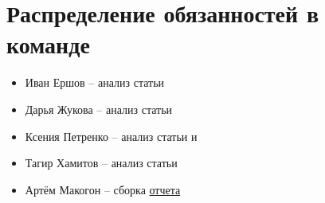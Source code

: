 
\section{Распределение обязанностей в команде}

\begin{itemize}
    \item Иван Ершов -- анализ статьи \cite{pipedream}
    \item Дарья Жукова -- анализ статьи \cite{beginning}
    \item Ксения Петренко -- анализ статьи \cite{shoeybi2019megatron} и \cite{vaswani2017attention}
    \item Тагир Хамитов -- анализ статьи \cite{DBLP}
    \item Артём Макогон -- сборка \href{https://github.com/makogon2907/HSE-Practice-Fall-2022}{отчета}
\end{itemize}